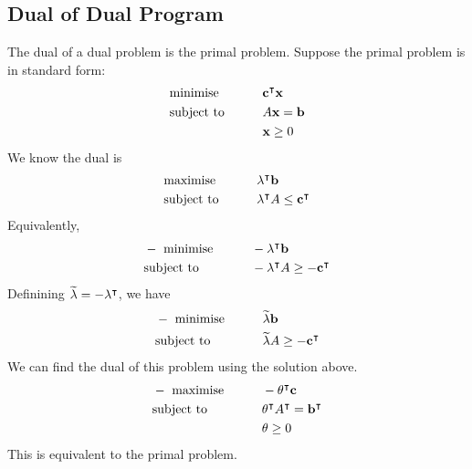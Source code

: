\subsection{Dual of Dual Program}
The dual of a dual problem is the primal problem.
Suppose the primal problem is in standard form:
\begin{alignat*}{2}
	 & \text{minimise}   & \qquad & \vb c^\intercal \vb x \\
	 & \text{subject to} &        & A \vb x = \vb b        \\
	 &                   &        & \vb x \geq 0
\end{alignat*}
We know the dual is
\begin{alignat*}{2}
	 & \text{maximise}   & \qquad & \vb \lambda^\intercal \vb b                   \\
	 & \text{subject to} &        & \vb \lambda^\intercal A \leq \vb c^\intercal \\
\end{alignat*}
Equivalently,
\begin{alignat*}{2}
	 & -\text{ minimise} & \qquad & -\vb \lambda^\intercal \vb b                    \\
	 & \text{subject to} &        & -\vb \lambda^\intercal A \geq -\vb c^\intercal \\
\end{alignat*}
Definining \( \widetilde{\vb \lambda} = -\vb\lambda^\intercal \), we have
\begin{alignat*}{2}
	 & -\text{ minimise} & \qquad & \widetilde{\vb \lambda} \vb b                    \\
	 & \text{subject to} &        & \widetilde{\vb \lambda} A \geq -\vb c^\intercal \\
\end{alignat*}
We can find the dual of this problem using the solution above.
\begin{alignat*}{2}
	 & -\text{ maximise} & \qquad & -\vb \theta^\intercal \vb c                          \\
	 & \text{subject to} &        & \vb \theta^\intercal A^\intercal = \vb b^\intercal \\
	 &                   &        & \vb \theta \geq 0
\end{alignat*}
This is equivalent to the primal problem.

